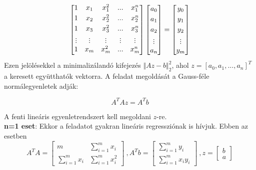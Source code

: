 \documentclass[tikz,12pt,margin=0px]{article}
\begin{document}
{\small
	\begin{displaymath}
	\begin{bmatrix}
	1 & x_{1} & x_{1}^{2} & ... & x_{1}^{n} \\[0.3em]
	1 & x_{2} & x_{2}^{2} & ... & x_{2}^{n} \\[0.3em]
	1 & x_{3} & x_{3}^{2} & ... & x_{3}^{n} \\[0.3em]
	\rotatebox[origin=c]{90}{...} & \rotatebox[origin=c]{90}{...} &\rotatebox[origin=c]{90}{...} & \rotatebox[origin=c]{90}{...} & \rotatebox[origin=c]{90}{...} \\[0.3em]
	1 & x_{m} & x_{m}^{2} & ... & x_{m}^{n} \\[0.3em]
	\end{bmatrix}
	\begin{bmatrix}
	a_{0} \\[0.3em]
	a_{1} \\[0.3em]
	a_{2} \\[0.3em]
	\rotatebox[origin=c]{90}{...} \\[0.3em]
	a_{n}
	\end{bmatrix}
	=
	\begin{bmatrix}
	y_{0} \\[0.3em]
	y_{1} \\[0.3em]
	y_{2} \\[0.3em]
	\rotatebox[origin=c]{90}{...} \\[0.3em]
	y_{m}
	\end{bmatrix}
	\end{displaymath}
}	
	\noindent Ezen jelölésekkel a minimalizálandó kifejezés $\Vert Az - b \Vert_{2}^{2}$, ahol $z = [a_{0},a_{1}, ..., a_{n}]^{T}$
	a keresett együtthatók vektorra. A feladat megoldását a Gauss-féle normálegyenletek adják:
	
	\begin{displaymath}
		A^{T}Az = A^{T}b
	\end{displaymath}
	
	\noindent A fenti lineáris egyenletrendszert kell megoldani $z$-re.\\
	
	\noindent \textbf{n=1 eset}: Ekkor a feladatot gyakran lineáris regressziónak is hívjuk. Ebben az esetben
	\begin{displaymath}
		A^{T}A = \begin{bmatrix}
		m & \sum\limits_{i=1}^{m} x_{i} \\[0.3em]
		\sum\limits_{i=1}^{m} x_{i} & \sum_{i=1}^{m} x_{i}^{2}
		\end{bmatrix} \ ,
		A^{T}b = \begin{bmatrix}
		\sum\limits_{i=1}^{m} y_{i} \\[0.3em]
		\sum\limits_{i=1}^{m} x_{i}y_ {i}
		\end{bmatrix} \ ,
		z = \begin{bmatrix}
		b \\[0.3em]
		a
		\end{bmatrix}
	\end{displaymath}
\newpage
\end{document}
